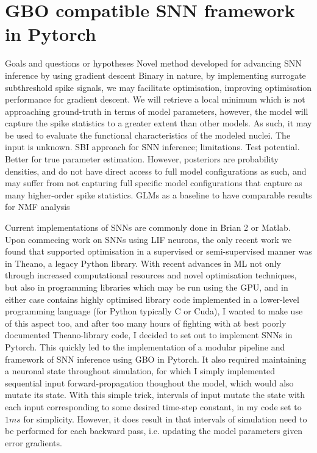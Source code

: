 \documentclass[mphil,deptreport,ianc]{infthesis} %
\begin{document}
\section{GBO compatible SNN framework in Pytorch}

Goals and questions or hypotheses
Novel method developed for advancing SNN inference by using gradient descent
Binary in nature, by implementing surrogate subthreshold spike signals, we may facilitate optimisation, improving optimisation performance for gradient descent.
We will retrieve a local minimum which is not approaching ground-truth in terms of model parameters, however, the model will capture the spike statistics to a greater extent than other models. As such, it may be used to evaluate the functional characteristics of the modeled nuclei.
The input is unknown.
SBI approach for SNN inference; limitations. Test potential.
Better for true parameter estimation. However,  posteriors are probability densities, and do not have direct access to full model configurations as such, and may suffer from not capturing full specific model configurations that capture as many higher-order spike statistics.
GLMs as a baseline to have comparable results for NMF analysis


Current implementations of SNNs are commonly done in Brian 2 or Matlab. Upon commecing work on SNNs using LIF neurons, the only recent work we found that supported optimisation in a supervised or semi-supervised manner was in Theano, a legacy Python library.
With recent advances in ML not only through increased computational resources and novel optimisation techniques, but also in programming libraries which may be run using the GPU, and in either case contains highly optimised library code implemented in a lower-level programming language (for Python typically C or Cuda), I wanted to make use of this aspect too, and after too many hours of fighting with at best poorly documented Theano-library code, I decided to set out to implement SNNs in Pytorch.
This quickly led to the implementation of a modular pipeline and framework of SNN inference using GBO in Pytorch.
It also required maintaining a neuronal state throughout simulation, for which I simply implemented sequential input forward-propagation thoughout the model, which would also mutate its state.
With this simple trick, intervals of input mutate the state with each input corresponding to some desired time-step constant, in my code set to $1 ms$ for simplicity. %
However, it does result in that intervals of simulation need to be performed for each backward pass, i.e. updating the model parameters given error gradients.
\end{document}

